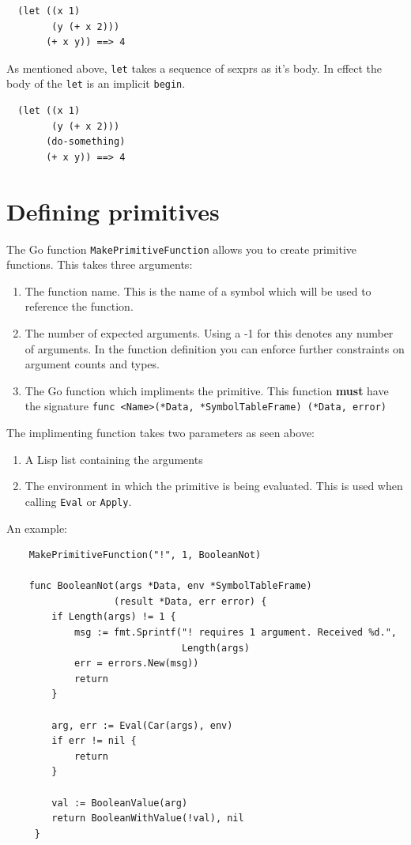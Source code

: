 \documentclass[12pt]{article}
\begin{document}
\begin{verbatim}
  (let ((x 1)
        (y (+ x 2)))
       (+ x y)) ==> 4
\end{verbatim}

As mentioned above, \verb|let| takes a sequence of sexprs as it's
body. In effect the body of the \verb|let| is an implicit
\verb|begin|.

\begin{verbatim}
  (let ((x 1)
        (y (+ x 2)))
       (do-something)
       (+ x y)) ==> 4
\end{verbatim}

\section{Defining primitives}

The Go function \verb|MakePrimitiveFunction| allows you to create
primitive functions. This takes three arguments:

\begin{enumerate}
\item The function name. This is the name of a symbol which will be
  used to reference the function. 
\item The number of expected arguments. Using a -1 for this denotes
  any number of arguments. In the function definition you can enforce
  further constraints on argument counts and types. 
\item The Go function which impliments the primitive. This function
  {\bf must} have the signature
  \verb|func <Name>(*Data, *SymbolTableFrame) (*Data, error)| 
\end{enumerate}

\noindent The implimenting function takes two parameters as seen
above:

\begin{enumerate}
\item A Lisp list containing the arguments
\item The environment in which the primitive
  is being evaluated. This is used when calling \verb|Eval| or \verb|Apply|.
\end{enumerate}

\noindent An example:

\begin{verbatim}
    MakePrimitiveFunction("!", 1, BooleanNot)

    func BooleanNot(args *Data, env *SymbolTableFrame) 
                   (result *Data, err error) {
        if Length(args) != 1 {
            msg := fmt.Sprintf("! requires 1 argument. Received %d.", 
                               Length(args)
            err = errors.New(msg))
            return
        }

        arg, err := Eval(Car(args), env)
        if err != nil {
            return
        }

        val := BooleanValue(arg)
        return BooleanWithValue(!val), nil
     }
\end{verbatim}
\end{document}
